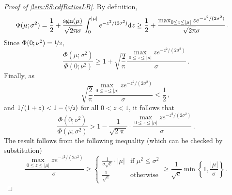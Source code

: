 \documentclass[11pt,letterpaper]{article}
\theoremstyle{plain}
\theoremstyle{definition}
\theoremstyle{remark}
\def\abs#1{\left| #1 \right|}
\newcommand{\inbrace}[1]{\ensuremath{\left\{#1\right\}}}
\newcommand{\sgn}{\operatornamewithlimits{sgn}}
\newcommand{\sfrac}[2]{{#1/#2}}
\newcommand{\nfrac}[2]{\nicefrac{#1}{#2}}
\renewcommand{\pi}{\uppi}
\renewcommand{\d}{{\rm d}}
\begin{document}
{{{            \begin{proof}[Proof of \cref{lem:SS:cdfRatiosLB}]
                By definition,
                \begin{align*}
                    \Phi(\mu;\sigma^2) 
                    &= \frac{1}{2} + \frac{\sgn(\mu)}{\sqrt{2\pi}\sigma} \int_{0}^{\abs{\mu}} e^{-z^2/(2\sigma^2)}\d z
                    \geq \frac{1}{2} + \frac{
                        \max_{0\leq z\leq \abs{\mu}} ze^{-z^2/(2\sigma^2)}
                    }{\sqrt{2\pi}\sigma}\,.
                \end{align*}
                Since $\Phi(0;\nu^2)=\nfrac{1}{2}$, 
                \[
                    \frac{\Phi(\mu;\sigma^2)}{\Phi(0;\nu^2)}
                    \geq 1 + \sqrt{\frac{2}{\pi}} \frac{
                        \max_{0\leq z\leq \abs{\mu}} ze^{-z^2/(2\sigma^2)}
                    }{\sigma}
                    \,.
                \]
                Finally, as  
                \[
                    \sqrt{\frac{2}{\pi}}\frac{
                        \max_{0\leq z\leq \abs{\mu}} ze^{-z^2/(2\sigma^2)}
                    }{\sigma}
                    < \frac{1}{2}\,,
                \]
                and $\sfrac{1}{(1+z)} < 1-(\nfrac{z}{2})$ for all $0 < z < 1$, it follows that 
                \[
                    \frac{\Phi(0;\nu^2)}{\Phi(\mu;\sigma^2)}
                    > 1 - \frac{1}{\sqrt{2\pi}}\cdot \frac{\max_{0\leq z\leq \abs{\mu}} ze^{-z^2/(2\sigma^2)}}{\sigma}\,.
                \]
                The result follows from the following inequality (which can be checked by substitution)
                \[
                    \frac{
                        \max_{0\leq z\leq \abs{\mu}} ze^{-z^2/(2\sigma^2)}
                    }{
                        \sigma 
                    }
                    \geq 
                    \begin{cases}
                        \frac{1}{\sigma\sqrt{e}}\cdot\abs{\mu} & \text{if } {\mu^2}\leq \sigma^2\\
                        \frac{1}{\sqrt{e}} & \text{otherwise}
                    \end{cases}
                    \geq \frac{1}{\sqrt{e}} \min\inbrace{1, \frac{\abs{\mu}}{\sigma}}\,.
                \]
            \end{proof}
            
}}}
\end{document}
